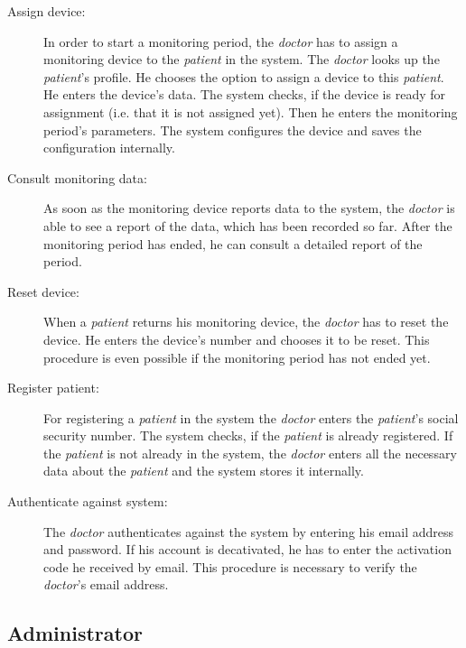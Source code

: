 \documentclass[fontsize=12pt,
               paper=a4,
               twoside=false,
               parskip=half,
               ]{scrartcl}
\begin{document}
\begin{description}

\item[Assign device:] In order to start a monitoring period, the \emph{doctor} has to assign a monitoring device to the \emph{patient} in the system. The \emph{doctor} looks up the \emph{patient}'s profile. He chooses the option to assign a device to this \emph{patient}. He enters the device's data. The system checks, if the device is ready for assignment (i.e. that it is not assigned yet). Then he enters the monitoring period's parameters. The system configures the device and saves the configuration internally.

\item[Consult monitoring data:] As soon as the monitoring device reports data to the system, the \emph{doctor} is able to see a report of the data, which has been recorded so far. After the monitoring period has ended, he can consult a detailed report of the period.

\item[Reset device:] When a \emph{patient} returns his monitoring device, the \emph{doctor} has to reset the device. He enters the device's number and chooses it to be reset. This procedure is even possible if the monitoring period has not ended yet.

\item[Register patient:] For registering a \emph{patient} in the system the \emph{doctor} enters the \emph{patient}'s social security number. The system checks, if the \emph{patient} is already registered. If the \emph{patient} is not already in the system, the \emph{doctor} enters all the necessary data about the \emph{patient} and the system stores it internally.

\item[Authenticate against system:] The \emph{doctor} authenticates against the system by entering his email address and password. If his account is decativated, he has to enter the activation code he received by email. This procedure is necessary to verify the \emph{doctor}'s email address.

\end{description}

\subsection{Administrator}
\end{document}
